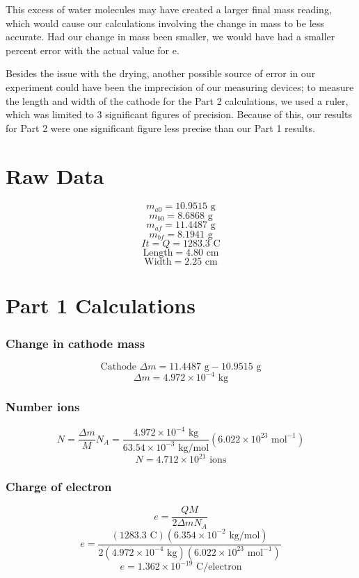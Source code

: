 \documentclass[fleqn]{article}
\begin{document}
This excess of water molecules may have created a larger final mass reading, which would cause our calculations involving the change in mass to be less accurate. Had our change in mass been smaller, we would have had a smaller percent error with the actual value for e.

Besides the issue with the drying, another possible source of error in our experiment could have been the imprecision of our measuring devices; to measure the length and width of the cathode for the Part 2 calculations, we used a ruler, which was limited to 3 significant figures of precision. Because of this, our results for Part 2 were one significant figure less precise than our Part 1 results.

\section*{Raw Data}
\[ m_{a0}=10.9515 \text{ g} \]
\[ m _{b0}=8.6868 \text{ g}  \]
\[ m _{af} =11.4487 \text{ g}  \]
\[m _{bf} = 8.1941 \text{ g}\]
\[ It = Q= 1283.3 \text{ C} \]
\[ \text{Length}=4.80 \text{ cm}\]
\[\text{Width} = 2.25 \text{ cm}\]

\section*{Part 1 Calculations}
\subsubsection*{Change in cathode mass}
\[ \text{Cathode } \Delta m = 11.4487 \text{ g} - 10.9515 \text{ g} \]
\[\boxed{\Delta m = 4.972 \times 10^{-4} \text{ kg} }\]

\subsubsection*{Number ions}
\[ N = \frac{\Delta m}{M} N_A
	= \frac{4.972 \times 10^{-4} \text{ kg}}{63.54 \times 10^{-3} \text{ kg/mol}}(6.022 \times 10^{23} \text{ mol}^{-1})
\]
\[ \boxed{N = 4.712 \times 10^{21} \text{ ions}} \]

\subsubsection*{Charge of electron}
\[ e = \frac{QM}{2 \Delta m N_A} \]
\[ e = \frac{(1283.3 \text{ C})(6.354 \times 10^{-2} \text{ kg/mol})}{2(4.972 \times 10^{-4} \text{ kg})
		(6.022 \times 10^{23} \text{ mol}^{-1})
	}\]
\[\boxed{ e= 1.362 \times 10^{-19} \text{ C/electron}}\]
\end{document}
